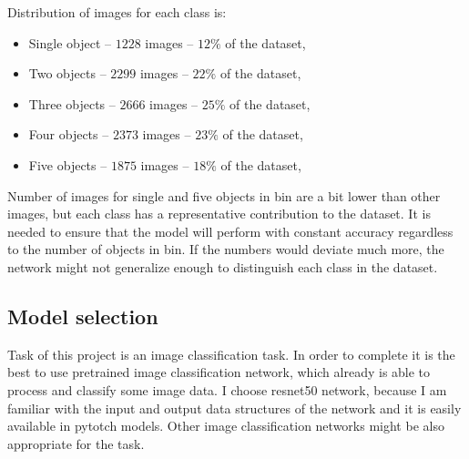 \documentclass{article}
\begin{document}
Distribution of images for each class is:
\begin{itemize}
	\item Single object -- $1228$ images -- $12\%$ of the dataset,
	\item Two objects -- $2299$ images -- $22\%$ of the dataset,  
	\item Three objects -- $2666$ images -- $25\%$ of the dataset,  
	\item Four objects -- $2373$ images -- $23\%$ of the dataset,
	\item Five objects -- $1875$ images -- $18\%$ of the dataset,  
\end{itemize}
Number of images for single and five objects in bin are a bit lower than other images, but each class has a representative contribution to the dataset. It is needed to ensure that the model will perform with constant accuracy regardless to the number of objects in bin. If the numbers would deviate much more, the network might not generalize enough to distinguish each class in the dataset.

\subsection{Model selection}
Task of this project is an image classification task. In order to complete it is the best to use pretrained image classification network, which already is able to process and classify some image data. I choose resnet50 network, because I am familiar with the input and output data structures of the network and it is easily available in pytotch models. Other image classification networks might be also appropriate for the task. 
\end{document}
